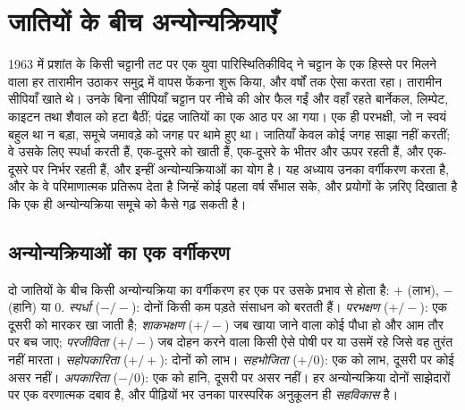 \chapter{जातियों के बीच अन्योन्यक्रियाएँ}\label{ch:b1:species-interactions}

1963 में प्रशांत के किसी चट्टानी तट पर एक युवा पारिस्थितिकीविद् ने चट्टान
के एक हिस्से पर मिलने वाला हर तारामीन उठाकर समुद्र में वापस फेंकना शुरू
किया, और वर्षों तक ऐसा करता रहा। तारामीन सीपियाँ खाते थे। उनके बिना
सीपियाँ चट्टान पर नीचे की ओर फैल गईं और वहाँ रहते बार्नेकल, लिम्पेट,
काइटन तथा शैवाल को हटा बैठीं; पंद्रह जातियों का एक  आठ पर आ गया।
एक ही परभक्षी, जो न स्वयं बहुल था न बड़ा, समूचे जमावड़े को जगह पर थामे
हुए था। जातियाँ केवल कोई जगह साझा नहीं करतीं; वे उसके लिए स्पर्धा करती
हैं, एक-दूसरे को खाती हैं, एक-दूसरे के भीतर और ऊपर रहती हैं, और
एक-दूसरे पर निर्भर रहती हैं, और  इन्हीं अन्योन्यक्रियाओं का योग है।
यह अध्याय उनका वर्गीकरण करता है,  और  के वे परिमाणात्मक
प्रतिरूप देता है जिन्हें कोई पहला वर्ष सँभाल सके, और प्रयोगों के ज़रिए
दिखाता है कि एक ही अन्योन्यक्रिया समूचे  को कैसे गढ़ सकती है।

\section{अन्योन्यक्रियाओं का एक वर्गीकरण}

\begin{definition}[अंतरजातीय अन्योन्यक्रियाएँ]\label{def:b1:species-interactions:types}
दो जातियों के बीच किसी अन्योन्यक्रिया का वर्गीकरण हर एक पर उसके प्रभाव से
होता है: $+$ (लाभ), $-$ (हानि) या $0$. \emph{स्पर्धा} ($-/-$): दोनों
किसी कम पड़ते संसाधन को बरतती हैं। \emph{परभक्षण} ($+/-$): एक दूसरी को
मारकर खा जाती है; \emph{शाकभक्षण} ($+/-$) जब खाया जाने वाला कोई पौधा हो
और आम तौर पर बच जाए; \emph{परजीविता} ($+/-$) जब दोहन करने वाला किसी ऐसे
पोषी पर या उसमें रहे जिसे वह तुरंत नहीं मारता। \emph{सहोपकारिता}
($+/+$): दोनों को लाभ। \emph{सहभोजिता} ($+/0$): एक को लाभ, दूसरी पर
कोई असर नहीं। \emph{अपकारिता} ($-/0$): एक को हानि, दूसरी पर असर नहीं।
हर अन्योन्यक्रिया दोनों साझेदारों पर एक वरणात्मक दबाव है, और पीढ़ियों
भर उनका पारस्परिक अनुकूलन ही \emph{सहविकास} है।
\end{definition}

